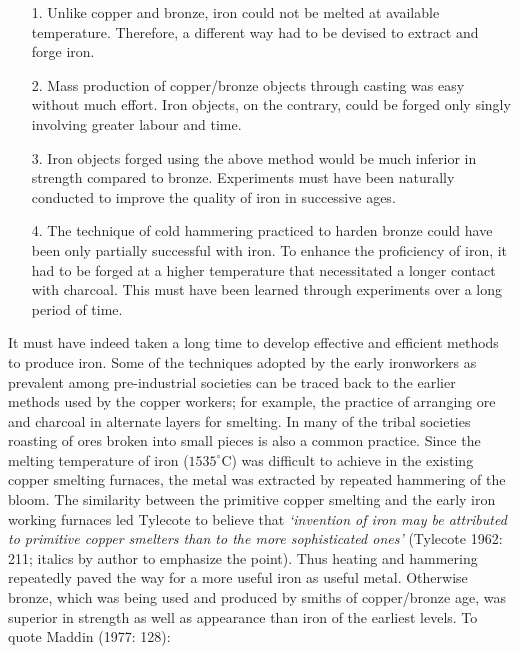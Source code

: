 \begin{itemize}
\item[1.] Unlike copper and bronze, iron could not be melted at available temperature. Therefore, a different way had to be devised to extract and forge iron.

\vspace{-.2cm}

\item[2.] Mass production of copper/bronze objects through casting was easy without much effort. Iron objects, on the contrary, could be forged only singly involving greater labour and time.

\newpage
\item[3.] Iron objects forged using the above method would be much inferior in strength compared to bronze. Experiments must have been naturally conducted to improve the quality of iron in successive ages.

\vspace{-.2cm}

\item[4.] The technique of cold hammering practiced to harden bronze could have been only partially successful with iron. To enhance the proficiency of iron, it had to be forged at a higher temperature that necessitated a longer contact with charcoal. This must have been learned through experiments over a long period of time. 
\end{itemize}

\vspace{-.2cm}

It must have indeed taken a long time to develop effective and efficient methods to produce iron. Some of the techniques adopted by the early ironworkers as prevalent among pre-industrial societies can be traced back to the earlier methods used by the copper workers; for example, the practice of arranging ore and charcoal in alternate layers for smelting. In many of the tribal societies roasting of ores broken into small pieces is also a common practice. Since the melting temperature of iron ($1535^{\circ}$C) was difficult to achieve in the existing copper smelting furnaces, the metal was extracted by repeated hammering of the bloom. The similarity between the primitive copper smelting and the early iron working furnaces led Tylecote to believe that \textit{`invention of iron may be attributed to primitive copper smelters than to the more sophisticated ones'} (Tylecote 1962: 211; italics by author to emphasize the point). Thus heating and hammering repeatedly paved the way for a more useful iron as useful metal. Otherwise bronze, which was being used and produced by smiths of copper/bronze age, was superior in strength as well as appearance than iron of the earliest levels. To quote Maddin (1977: 128): 

